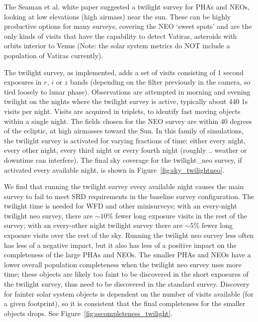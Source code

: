 The Seaman et al. white paper suggested a twilight survey for PHAs and NEOs, looking at low elevations (high airmass) near the sun. These can be highly productive options for many surveys, covering the NEO `sweet spots' and are the only kinds of visits that have the capability to detect Vatiras, asteroids with orbits interior to Venus (Note: the solar system metrics do NOT include a population of Vatiras currently). 

The twilight survey, as implemented, adds a set of visits consisting of 1 second exposures in $r$, $i$ or $z$ bands (depending on the filter previously in the camera, so tied loosely to lunar phase). Observations are attempted in morning and evening twilight on the nights where the twilight survey is active, typically about 440 1s visits per night. Visits are acquired in triplets, to identify fast moving objects within a single night. The fields chosen for the NEO survey are within 40 degrees of the ecliptic, at high airmasses toward the Sun. In this family of simulations, the twilight survey is activated for varying fractions of time: either every night, every other night, every third night or every fourth night (roughly .. weather or downtime can interfere). The final sky coverage for the twilight\_neo survey, if activated every available night, is shown in Figure~\ref{fig:sky_twilightneo}. 

We find that running the twilight survey every available night causes the main survey to fail to meet SRD requirements in the baseline survey configuration. The twilight time is needed for WFD and other minisurveys; with an every-night twilight neo survey, there are $\sim10$\% fewer long exposure visits in the rest of the survey; with an every-other night twilight survey there are $\sim5$\% fewer long exposure visits over the rest of the sky. Running the twilight neo survey less often has less of a negative impact, but it also has less of a positive impact on the completeness of the large PHAs and NEOs. The smaller PHAs and NEOs have a lower overall population completeness when the twilight neo survey uses more time; these objects are likely too faint to be discovered in the short exposures of the twilight survey, thus need to be discovered in the standard survey. Discovery for fainter solar system objects is dependent on the number of visits available (for a given footprint), so it is consistent that the final completeness for the smaller objects drops. See Figure~\ref{fig:sscompleteness_twilight}. 

